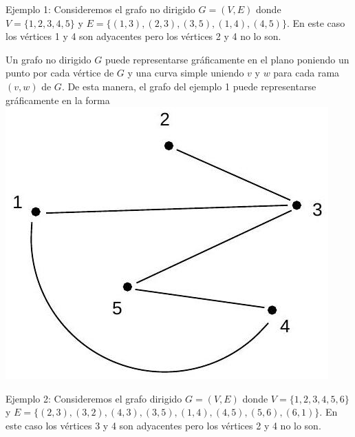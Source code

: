 \documentclass[10pt]{article}
\begin{document}
Ejemplo 1: Consideremos el grafo no dirigido $G=(V, E)$ donde $V=\{1,2,3,4,5\}$ y $E=\{(1,3),(2,3),(3,5),(1,4),(4,5)\}$. En este caso los vértices 1 y 4 son adyacentes pero los vértices 2 y 4 no lo son.

Un grafo no dirigido $G$ puede representarse gráficamente en el plano poniendo un punto por cada vértice de $G$ y una curva simple uniendo $v$ y $w$ para cada rama $(v, w)$ de $G$. De esta manera, el grafo del ejemplo 1 puede representarse gráficamente en la forma\\
\includegraphics[max width=\textwidth, center]{2025_09_05_b69e29efaf9a6d2aa81ag-04}

Ejemplo 2: Consideremos el grafo dirigido $G=(V, E)$ donde $V=\{1,2,3,4,5,6\}$ y $E=\{(2,3),(3,2),(4,3),(3,5),(1,4),(4,5),(5,6),(6,1)\}$. En este caso los vértices 3 y 4 son adyacentes pero los vértices 2 y 4 no lo son.
\end{document}

